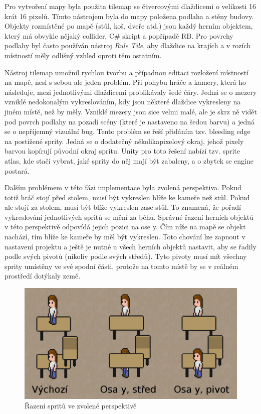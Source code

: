 \documentclass[FM,Proj,bw]{tulthesis}
\begin{document}
	Pro vytvoření mapy byla použita tilemap se čtvercovými dlaždicemi o velikosti 16 krát 16 pixelů. Tímto nástrojem byla do mapy položena podlaha a stěny budovy. Objekty rozmístěné po mapě (stůl, koš, dveře atd.) jsou každý herním objektem, který má obvykle nějaký collider, C\# skript a popřípadě RB. Pro povrchy podlahy byl často používán nástroj \textit{Rule Tile}, aby dlaždice na krajích a v rozích místností měly odlišný vzhled oproti těm ostatním.
	
	Nástroj tilemap umožnil rychlou tvorbu a případnou editaci rozložení místností na mapě, nesl s sebou ale jeden problém. Při pohybu hráče a kamery, která ho následuje, mezi jednotlivými dlaždicemi problikávaly šedé čáry. Jedná se o mezery vzniklé nedokonalým vykreslováním, kdy jsou některé dlaždice vykresleny na jiném místě, než by měly. Vzniklé mezery jsou sice velmi malé, ale je skrz ně vidět pod povrch podlahy na pozadí scény (které je nastaveno na šedou barvu) a jedná se o nepříjemný vizuální bug. Tento problém se řeší přidáním tzv. bleeding edge na postižené sprity. Jedná se o dodatečný několikapixelový okraj, jehož pixely barvou kopírují původní okraj spritu. Unity pro toto řešení nabízí tzv. sprite atlas, kde stačí vybrat, jaké sprity do něj mají být zabaleny, a o zbytek se engine postará.
	
	Dalším problémem v této fázi implementace byla zvolená perspektiva. Pokud totiž hráč stojí před stolem, musí být vykreslen blíže ke kameře než stůl. Pokud ale stojí za stolem, musí být blíže vykreslen zase stůl. To znamená, že pořadí vykreslování jednotlivých spritů se mění za běhu. Správné řazení herních objektů v této perspektivě odpovídá jejich pozici na ose y. Čím níže na mapě se objekt nachází, tím blíže ke kameře by měl být vykreslen. Toto chování lze zapnout v nastavení projektu a ještě je nutné u všech herních objektů nastavit, aby se řadily podle svých pivotů (nikoliv podle svých středů). Tyto pivoty musí mít všechny sprity umístěny ve své spodní části, protože na tomto místě by se v reálném prostředí dotýkaly země.
	
	\begin{figure}[ht]
		\centering
		\includegraphics[width=\textwidth]{img/SpriteSort}
		\caption{Řazení spritů ve zvolené perspektivě}		
	\end{figure}
	
\end{document}
